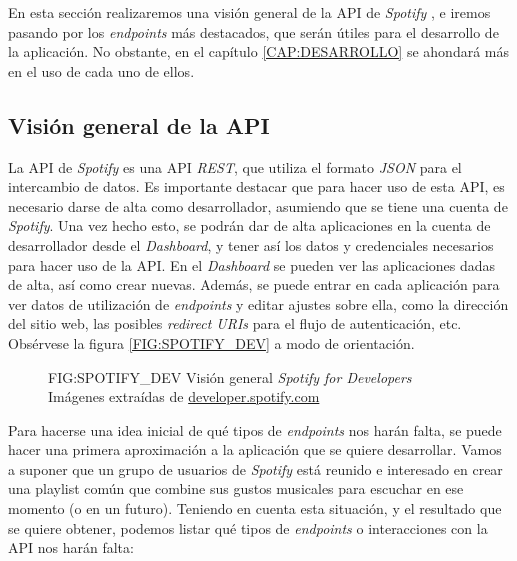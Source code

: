 En esta sección realizaremos una visión general de la API de \textit{Spotify} \cite{spotify_api}, e iremos pasando por
los \textit{endpoints} más destacados, que serán útiles para el desarrollo de la aplicación. No obstante, 
en el capítulo \ref{CAP:DESARROLLO} se ahondará más en el uso de cada uno de ellos.

\subsection{Visión general de la API\label{subsec:vision_general_api}}

La API de \textit{Spotify} \cite{spotify_api} es una API \textit{REST}, que utiliza el formato \textit{JSON} para el intercambio 
de datos. Es importante destacar que para hacer uso de esta API, es necesario darse de alta como desarrollador, asumiendo que se 
tiene una cuenta de \textit{Spotify}. Una vez hecho esto, se podrán dar de alta aplicaciones en la cuenta de desarrollador desde el
\textit{Dashboard}, y tener así los datos y credenciales necesarios para hacer uso de la API. 
En el \textit{Dashboard} se pueden ver las aplicaciones dadas de alta, así como crear nuevas. Además, se puede entrar en cada
aplicación para ver datos de utilización de \textit{endpoints} y editar ajustes sobre ella, como la dirección del sitio web,
las posibles \textit{redirect URIs} para el flujo de autenticación, etc.
Obsérvese la figura \ref{FIG:SPOTIFY_DEV}
a modo de orientación.

\begin{figure}[Visión general \textit{Spotify for Developers}]{FIG:SPOTIFY_DEV}
    {Visión general \textit{Spotify for Developers} \\
    {\scriptsize Imágenes extraídas de \href{https://developer.spotify.com/dashboard/}{developer.spotify.com}}}
     \quad
     \quad
\end{figure}

Para hacerse una idea inicial de qué tipos de \textit{endpoints} nos harán falta, se puede hacer una primera aproximación
a la aplicación que se quiere desarrollar. Vamos a suponer que un grupo de usuarios de \textit{Spotify} está 
reunido e interesado en crear una playlist común que combine sus gustos musicales para escuchar en ese momento
(o en un futuro). Teniendo en cuenta esta situación, y el resultado que se quiere obtener, podemos
listar qué tipos de \textit{endpoints} o interacciones con la API nos harán falta:

